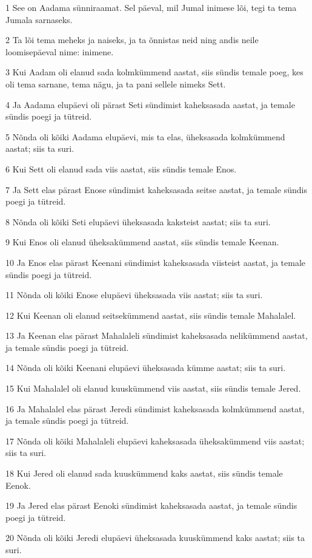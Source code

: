 \par 1 See on Aadama sünniraamat. Sel päeval, mil Jumal inimese lõi, tegi ta tema Jumala sarnaseks.
\par 2 Ta lõi tema meheks ja naiseks, ja ta õnnistas neid ning andis neile loomisepäeval nime: inimene.
\par 3 Kui Aadam oli elanud sada kolmkümmend aastat, siis sündis temale poeg, kes oli tema sarnane, tema nägu, ja ta pani sellele nimeks Sett.
\par 4 Ja Aadama elupäevi oli pärast Seti sündimist kaheksasada aastat, ja temale sündis poegi ja tütreid.
\par 5 Nõnda oli kõiki Aadama elupäevi, mis ta elas, üheksasada kolmkümmend aastat; siis ta suri.
\par 6 Kui Sett oli elanud sada viis aastat, siis sündis temale Enos.
\par 7 Ja Sett elas pärast Enose sündimist kaheksasada seitse aastat, ja temale sündis poegi ja tütreid.
\par 8 Nõnda oli kõiki Seti elupäevi üheksasada kaksteist aastat; siis ta suri.
\par 9 Kui Enos oli elanud üheksakümmend aastat, siis sündis temale Keenan.
\par 10 Ja Enos elas pärast Keenani sündimist kaheksasada viisteist aastat, ja temale sündis poegi ja tütreid.
\par 11 Nõnda oli kõiki Enose elupäevi üheksasada viis aastat; siis ta suri.
\par 12 Kui Keenan oli elanud seitsekümmend aastat, siis sündis temale Mahalalel.
\par 13 Ja Keenan elas pärast Mahalaleli sündimist kaheksasada nelikümmend aastat, ja temale sündis poegi ja tütreid.
\par 14 Nõnda oli kõiki Keenani elupäevi üheksasada kümme aastat; siis ta suri.
\par 15 Kui Mahalalel oli elanud kuuskümmend viis aastat, siis sündis temale Jered.
\par 16 Ja Mahalalel elas pärast Jeredi sündimist kaheksasada kolmkümmend aastat, ja temale sündis poegi ja tütreid.
\par 17 Nõnda oli kõiki Mahalaleli elupäevi kaheksasada üheksakümmend viis aastat; siis ta suri.
\par 18 Kui Jered oli elanud sada kuuskümmend kaks aastat, siis sündis temale Eenok.
\par 19 Ja Jered elas pärast Eenoki sündimist kaheksasada aastat, ja temale sündis poegi ja tütreid.
\par 20 Nõnda oli kõiki Jeredi elupäevi üheksasada kuuskümmend kaks aastat; siis ta suri.
